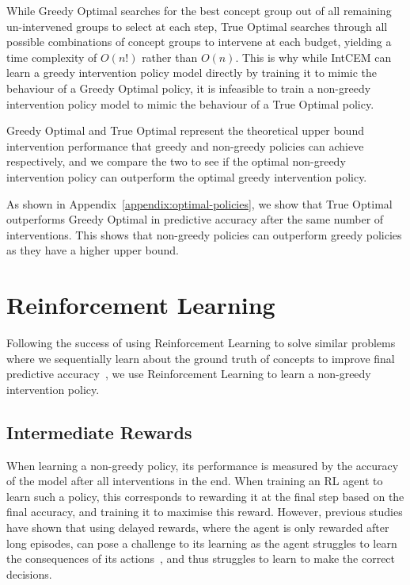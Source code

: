 While Greedy Optimal searches for 
the best concept group
out of all remaining un-intervened groups
to select at each step, True Optimal searches through
all possible combinations of concept groups to intervene at each budget, yielding
a time complexity of $O(n!)$ rather than
$O(n)$. This is why while IntCEM can 
learn a greedy intervention policy model directly
by training it to mimic the behaviour of a Greedy Optimal 
policy, it is infeasible to train a non-greedy intervention policy
model to mimic the behaviour of a True Optimal policy.

Greedy Optimal and True Optimal represent the theoretical
upper bound intervention performance
that greedy and non-greedy policies can achieve respectively,
and we compare the two to see if the optimal 
non-greedy intervention policy can outperform the 
optimal greedy
intervention policy.

As shown in Appendix~\ref{appendix:optimal-policies}, we show that True Optimal outperforms
Greedy Optimal in predictive accuracy after the same number of interventions.
 This shows that non-greedy policies 
can outperform greedy policies as they have a higher upper bound.




\section{Reinforcement Learning}\label{method:rl}
Following the success of using 
Reinforcement Learning to solve similar problems where we sequentially learn about the ground truth of concepts to improve final predictive accuracy~\cite{gsmrl,non-greedy-1},
we use Reinforcement Learning to learn a non-greedy intervention policy.

\subsection{Intermediate Rewards}

When learning a non-greedy policy, its performance is measured by the accuracy
of the model after all interventions in the end.
When training an RL agent to learn such a policy, this corresponds
to rewarding it at the final step based 
on the final accuracy, and training it to maximise this reward.
However, previous studies have shown that
using delayed rewards, where the agent is only rewarded after long episodes,
can pose a challenge to its learning as the agent struggles to learn
the consequences of its actions~\cite{ steps-towards-ai, temporal-credit-assignment},
and thus struggles to learn to make the correct decisions.

